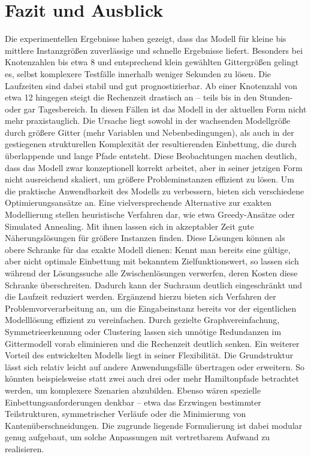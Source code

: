 \documentclass[bachelor, german]{algothesis}
\begin{document}
\chapter{Fazit und Ausblick}
Die experimentellen Ergebnisse haben gezeigt, dass das Modell für kleine bis mittlere Instanzgrößen zuverlässige und schnelle Ergebnisse liefert. Besonders bei Knotenzahlen bis etwa 8 und entsprechend klein gewählten Gittergrößen gelingt es, selbst komplexere Testfälle innerhalb weniger Sekunden zu lösen. Die Laufzeiten sind dabei stabil und gut prognostizierbar. Ab einer Knotenzahl von etwa 12 hingegen steigt die Rechenzeit drastisch an – teils bis in den Stunden- oder gar Tagesbereich. In diesen Fällen ist das Modell in der aktuellen Form nicht mehr praxistauglich. Die Ursache liegt sowohl in der wachsenden Modellgröße durch größere Gitter (mehr Variablen und Nebenbedingungen), als auch in der gestiegenen strukturellen Komplexität der resultierenden Einbettung, die durch überlappende und lange Pfade entsteht.\newline 
Diese Beobachtungen machen deutlich, dass das Modell zwar konzeptionell korrekt arbeitet, aber in seiner jetzigen Form nicht ausreichend skaliert, um größere Probleminstanzen effizient zu lösen.\newline
Um die praktische Anwendbarkeit des Modells zu verbessern, bieten sich verschiedene Optimierungsansätze an. Eine vielversprechende Alternative zur exakten Modellierung stellen heuristische  Verfahren dar, wie etwa Greedy-Ansätze oder Simulated Annealing. Mit ihnen lassen sich in akzeptabler Zeit gute Näherungslösungen für größere Instanzen finden. Diese Lösungen können als obere Schranke für das exakte Modell dienen: Kennt man bereits eine gültige, aber nicht optimale Einbettung mit bekanntem Zielfunktionswert, so lassen sich während der Lösungssuche alle Zwischenlösungen verwerfen, deren Kosten diese Schranke überschreiten. Dadurch kann der Suchraum deutlich eingeschränkt und die Laufzeit reduziert werden. Ergänzend hierzu bieten sich Verfahren der Problemvorverarbeitung an, um die Eingabeinstanz bereits vor der eigentlichen Modelllösung effizient zu vereinfachen. Durch gezielte Graphvereinfachung, Symmetrieerkennung oder Clustering lassen sich unnötige Redundanzen im Gittermodell vorab eliminieren und die Rechenzeit deutlich senken.\newline
Ein weiterer Vorteil des entwickelten Modells liegt in seiner Flexibilität. Die Grundstruktur lässt sich relativ leicht auf andere Anwendungsfälle übertragen oder erweitern. So könnten beispielsweise statt zwei auch drei oder mehr Hamiltonpfade betrachtet werden, um komplexere Szenarien abzubilden. Ebenso wären spezielle Einbettungsanforderungen denkbar – etwa das Erzwingen bestimmter Teilstrukturen, symmetrischer Verläufe oder die Minimierung von Kantenüberschneidungen. Die zugrunde liegende Formulierung ist dabei modular genug aufgebaut, um solche Anpassungen mit vertretbarem Aufwand zu realisieren.\newline 
\end{document}
